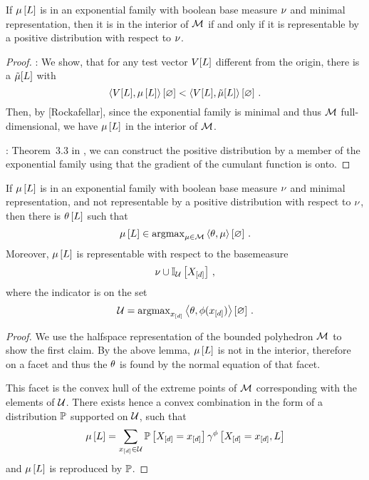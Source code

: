 \begin{lemma}
	If $\mu\left[L\right]$ is in an exponential family with boolean base measure $\nu$ and minimal representation, then it is in the interior of $\mathcal{M}$ if and only if it is representable by a positive distribution with respect to $\nu$.
\end{lemma}
\begin{proof} 
	\proofrightsymbol: %
		We show, that for any test vector $V[L]$ different from the origin, there is a $\tilde{\mu}[L]$ with
			\[ \left\langle V[L],\mu\left[L\right]\right\rangle \left[ \varnothing \right] <  \left\langle V[L],\tilde{\mu}[L]\right\rangle \left[ \varnothing \right] \, . \]
		Then, by [Rockafellar], since the exponential family is minimal and thus $\mathcal{M}$ full-dimensional, we have $\mu\left[L\right]$ in the interior of $\mathcal{M}$.
	
	\proofleftsymbol: Theorem~3.3 in \cite{wainwright_graphical_2008}, we can construct the positive distribution by a member of the exponential family using that the gradient of the cumulant function is onto.
\end{proof}


\begin{lemma}
	If $\mu\left[L\right]$ is in an exponential family with boolean base measure $\nu$ and minimal representation, and not representable by a positive distribution with respect to $\nu$, then there is $\theta\left[L\right]$ such that
		\[ \mu\left[L\right] \in \mathrm{argmax}_{\mu\in\mathcal{M}} \left\langle \theta,\mu\right\rangle \left[ \varnothing \right] \, . \]
	Moreover, $\mu\left[L\right]$ is representable with respect to the basemeasure
		\[ \nu \cup  \mathbb{I}_{\mathcal{U}}\left[X_{[d]}\right] \, , \]
	where the indicator is on the set
		\[ \mathcal{U} = \mathrm{argmax}_{x_{[d]}} \left\langle \theta,\phi(x_{[d]})\right\rangle \left[ \varnothing \right]  \, . \]
\end{lemma}
\begin{proof}
	We use the halfspace representation of the bounded polyhedron $\mathcal{M}$ to show the first claim.
	By the above lemma, $\mu\left[L\right]$ is not in the interior, therefore on a facet and thus the $\theta$ is found by the normal equation of that facet.
	
	This facet is the convex hull of the extreme points of $\mathcal{M}$ corresponding with the elements of $\mathcal{U}$.
	There exists hence a convex combination in the form of a distribution $\mathbb{P}$ supported on $\mathcal{U}$, such that 
		\[ \mu\left[L\right] = \sum_{x_{[d]}\in\mathcal{U}} \mathbb{P}\left[X_{[d]}=x_{[d]}\right] \gamma^{\phi}\left[X_{[d]}=x_{[d]},L\right] \]
	and $\mu\left[L\right]$ is reproduced by $\mathbb{P}$.
\end{proof}

